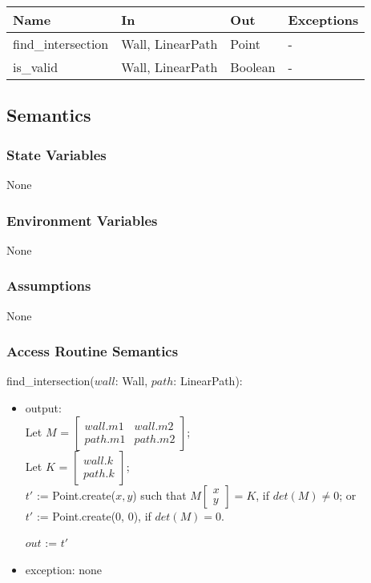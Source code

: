 \documentclass[12pt, titlepage]{article}
\begin{document}
\begin{center}
\begin{tabular}{p{4cm} p{2.3cm} p{3cm} p{2cm}}
\hline
\textbf{Name} & \textbf{In} & \textbf{Out} & \textbf{Exceptions} \\
\hline
find\_intersection & Wall, LinearPath & Point & - \\
is\_valid & Wall, LinearPath & Boolean & - \\
\hline
\end{tabular}
\end{center}

\subsection{Semantics}

\subsubsection{State Variables}None

\subsubsection{Environment Variables} None

\subsubsection{Assumptions} None

\subsubsection{Access Routine Semantics}

\noindent find\_intersection($wall$: Wall, $path$: LinearPath):
\begin{itemize}
\item output: \\
Let $M$ = 
$\begin{bmatrix}
wall.m1 & wall.m2\\
path.m1 & path.m2
\end{bmatrix}$;\\
Let $K$ = 
$\begin{bmatrix}
wall.k\\
path.k
\end{bmatrix}$;\\

$t'$ := Point.create($x, y$) such that $M
\begin{bmatrix}
x\\
y
\end{bmatrix} = K
$, if $det(M) \neq 0$; or\\

$t'$ := Point.create(0, 0), if $det(M) = 0$.

$out$ := $t'$
\item exception: none
\end{itemize}
\end{document}
